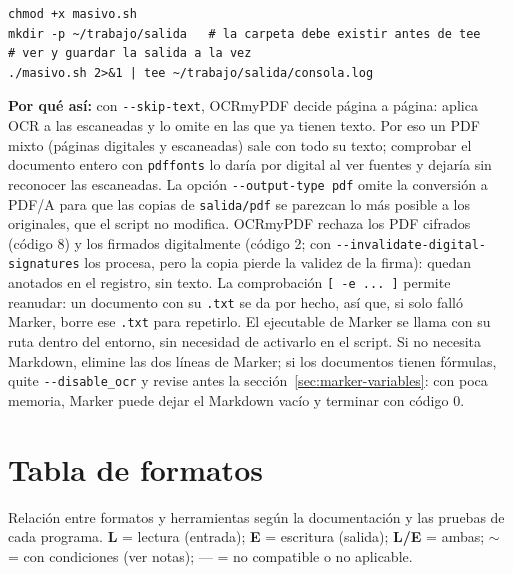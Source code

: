 \documentclass[11pt,a4paper]{article}
\newcommand{\cmd}[1]{\texttt{\textcolor{colcmd}{#1}}}      %
\newcommand{\opt}[1]{\texttt{\textcolor{colopt}{#1}}}      %
\newcommand{\arch}[1]{\texttt{\textcolor{colarch}{#1}}}    %
\newcommand{\condic}{\textcolor{coladvert}{$\boldsymbol{\sim}$}}
\begin{document}
	\begin{lstlisting}
chmod +x masivo.sh
mkdir -p ~/trabajo/salida   # la carpeta debe existir antes de tee
# ver y guardar la salida a la vez
./masivo.sh 2>&1 | tee ~/trabajo/salida/consola.log
\end{lstlisting}
	
	\textbf{Por qué así:} con \opt{-{}-skip-text}, OCRmyPDF decide página a página: aplica OCR a las escaneadas y lo omite en las que ya tienen texto. Por eso un PDF mixto (páginas digitales y escaneadas) sale con todo su texto; comprobar el documento entero con \cmd{pdffonts} lo daría por digital al ver fuentes y dejaría sin reconocer las escaneadas. La opción \opt{-{}-output-type pdf} omite la conversión a PDF/A para que las copias de \arch{salida/\allowbreak{}pdf} se parezcan lo más posible a los originales, que el script no modifica. OCRmyPDF rechaza los PDF cifrados (código 8) y los firmados digitalmente (código 2; con \opt{-{}-invalidate-\allowbreak{}digital-\allowbreak{}signatures} los procesa, pero la copia pierde la validez de la firma): quedan anotados en el registro, sin texto. La comprobación \texttt{[ -e ... ]} permite reanudar: un documento con su \arch{.txt} se da por hecho, así que, si solo falló Marker, borre ese \arch{.txt} para repetirlo. El ejecutable de Marker se llama con su ruta dentro del entorno, sin necesidad de activarlo en el script. Si no necesita Markdown, elimine las dos líneas de Marker; si los documentos tienen fórmulas, quite \opt{-{}-disable\_ocr} y revise antes la sección~\ref{sec:marker-variables}: con poca memoria, Marker puede dejar el Markdown vacío y terminar con código 0.
	\clearpage
	\section{Tabla de formatos}\label{sec:formatos}
	
	Relación entre formatos y herramientas según la documentación y las pruebas de cada programa. \textbf{L} = lectura (entrada); \textbf{E} = escritura (salida); \textbf{L/E} = ambas; \condic{} = con condiciones (ver notas); --- = no compatible o no aplicable.
	
\end{document}
